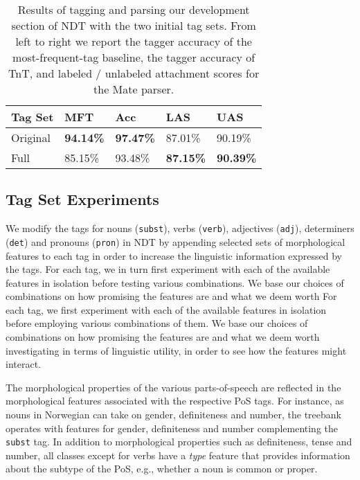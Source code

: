 \documentclass[11pt,a4paper]{article}
\begin{document}
\begin{table}
    \centering
    \smaller[0.5]
    \begin{tabular}{@{}lllll@{}}
        \toprule
        \textbf{Tag Set} & \textbf{MFT} & \textbf{Acc} &
        \textbf{LAS} & \textbf{UAS} \\
        \midrule
        Original & \textbf{94.14\%} & \textbf{97.47\%} & 87.01\% & 90.19\% \\
        Full & 85.15\% & 93.48\% & \textbf{87.15\%} & \textbf{90.39\%} \\
        \bottomrule
    \end{tabular}
    \caption{Results of tagging and parsing our development section of NDT with
      the two initial tag sets. From left to right we report the tagger
      accuracy of the most-frequent-tag baseline, the tagger accuracy of TnT,
      and labeled / unlabeled attachment scores for the Mate parser.}
    \label{inittagseteval}
\end{table}

\subsection{Tag Set Experiments}
We modify the tags for nouns (\texttt{subst}), verbs (\texttt{verb}),
adjectives (\texttt{adj}), determiners (\texttt{det}) and pronouns
(\texttt{pron}) in NDT by appending selected sets of morphological features to
each tag in order to increase the linguistic information expressed by the tags.
For each tag, we in turn first experiment with each of the available features in
isolation before testing various combinations. We base our choices
of combinations on how promising the features are and what we deem worth
For each tag, we first experiment with each of the available features in
isolation before employing various combinations of them. We base our choices of
combinations on how promising the features are and what we deem worth
investigating in terms of linguistic utility, in order to see how the features
might interact.

The morphological properties of the various parts-of-speech are reflected in
the morphological features associated with the respective PoS tags. For
instance, as nouns in Norwegian can take on gender, definiteness and number,
the treebank operates with features for gender, definiteness and number
complementing the \texttt{subst} tag. In addition to morphological properties
such as definiteness, tense and number, all classes except for verbs have a
\emph{type} feature that provides information about the subtype of the PoS,
e.g., whether a noun is common or proper.
\end{document}
